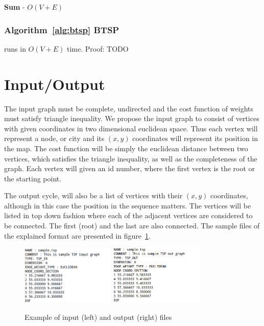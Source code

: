 \documentclass[runningheads, a4paper]{llncs}
\begin{document}
\textbf{Sum} - $O(V + E)$

\subsubsection{Algorithm~\ref{alg:btsp} BTSP}
runs in $O(V+E)$ time. Proof:
TODO
\section{Input/Output}
The input graph must be complete, undirected and the cost function of weights must satisfy triangle inequality. We propose the input graph to consist of vertices with given coordinates in two dimensional euclidean space. Thus each vertex will represent a node, or city and its $(x,y)$ coordinates will represent its position in the map. The cost function will be simply the euclidean distance between two vertices, which satisfies the triangle inequality, as well as the completeness of the graph. Each vertex will given an id number, where the first vertex is the root or the starting point.

The output cycle, will also be a list of vertices with their $(x,y)$ coordinates, although in this case the position in the sequence matters. The vertices will be listed in top down fashion where each of the adjacent vertices are considered to be connected. The first (root) and the last are also connected. The sample files of the explained format are presented in figure~\ref{fig:io}.

\begin{figure}[H]
    \includegraphics[width=0.4\textwidth]{res/tsp_input.png}
    \includegraphics[width=0.4\textwidth]{res/tsp_out.png}
    
    \caption{Example of input (left) and output (right) files}
    \label{fig:io}
\end{figure}
\end{document}
